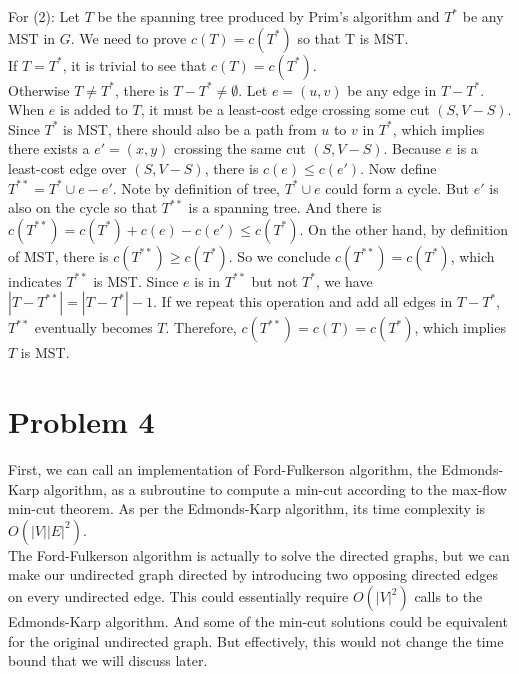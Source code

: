 \documentclass[titlepage, paper=a4, fontsize=11pt]{scrartcl} %
\numberwithin{equation}{section} %
\numberwithin{figure}{section} %
\numberwithin{table}{section} %
\numberwithin{figure}{section}
\begin{document}
For (2): Let $T$ be the spanning tree produced by Prim's algorithm and $T^*$ be any MST in $G$. We need to prove $c(T)=c(T^*)$ so that T is MST. \\
If $T=T^*$, it is trivial to see that $c(T)=c(T^*)$. \\
Otherwise $T \neq T^*$, there is $T-T^* \neq \emptyset$. Let $e=(u,v)$ be any edge in $T-T^*$. When
$e$ is added to $T$, it must be a least-cost edge crossing some cut $(S, V-S)$. Since $T^*$ is MST, there should also be a path from $u$ to $v$ in $T^*$, which implies there exists a $e'=(x,y)$ crossing the same cut $(S, V-S)$. Because $e$ is a least-cost edge over $(S, V-S)$, there is $c(e) \leq c(e')$. Now define $T^{**}=T^* \cup e - e'$. Note by definition of tree, $T^* \cup e$ could form a cycle. But $e'$ is also on the cycle so that $T^{**}$ is a spanning tree. And there is $c(T^{**})=c(T^*)+c(e)-c(e') \leq c(T^*)$. On the other hand, by definition of MST, there is $c(T^{**}) \geq c(T^*)$. So we conclude $c(T^{**})=c(T^*)$, which indicates $T^{**}$ is MST. Since $e$ is in $T^{**}$ but not $T^*$, we have $|T-T^{**}|=|T-T^*|-1$. If we repeat this operation and add all edges in $T-T^*$, $T^{**}$ eventually becomes $T$. Therefore, $c(T^{**})=c(T)=c(T^*)$, which implies $T$ is MST. \\






\section*{Problem 4}
First, we can call an implementation of Ford-Fulkerson algorithm, the Edmonds-Karp algorithm, as a subroutine to compute a min-cut according to the max-flow min-cut theorem. As per the Edmonds-Karp algorithm, its time complexity is $O(|V||E|^2)$. \\

The Ford-Fulkerson algorithm is actually to solve the directed graphs, but we can make our undirected graph directed by introducing two opposing directed edges on every undirected edge. This could essentially require $O(|V|^2)$ calls to the Edmonds-Karp algorithm. And some of the min-cut solutions could be equivalent for the original undirected graph. But effectively, this would not change the time bound that we will discuss later. \\
\end{document}
